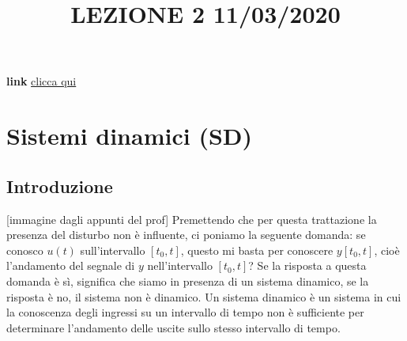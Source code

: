 \title{LEZIONE 2 11/03/2020}\newline
\textbf{link} \href{https://web.microsoftstream.com/video/c3fbadab-4a18-4fbd-bd5c-3a50914235b4?list=user&userId=faa91214-a6f5-40d7-8875-253fd49b8ce1}{clicca qui}
\section{Sistemi dinamici (SD)} 
\subsection{Introduzione}
[immagine dagli appunti del prof]\newline
Premettendo che per questa trattazione la presenza del disturbo non è influente, ci poniamo la seguente domanda: se conosco $u(t)$ sull'intervallo $[t_0, t]$, questo mi basta per conoscere $y[t_0,t]$, cioè l'andamento del segnale di $y$ nell'intervallo $[t_0,t]$?\newline
Se la risposta a questa domanda è sì, significa che siamo in presenza di un sistema dinamico, se la risposta è no, il sistema non è dinamico.\newline
\newline
Un sistema dinamico è un sistema in cui la conoscenza degli ingressi su un intervallo di tempo non è sufficiente per determinare l'andamento delle uscite sullo stesso intervallo di tempo.
